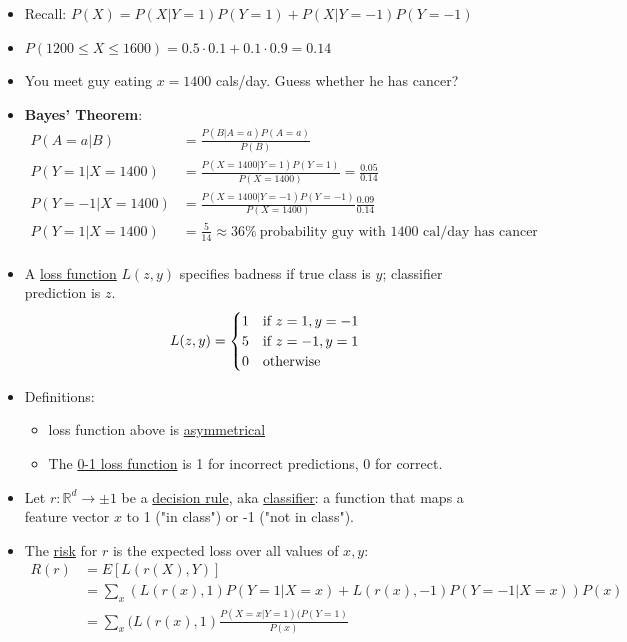 \documentclass[10pt]{article}
\begin{document}
\begin{description}
\begin{itemize}
		\item Recall: $P(X) = P(X|Y=1)P(Y=1) + P(X|Y=-1)P(Y=-1)$
		\item $P(1200 \leq X \leq 1600) = 0.5\cdot 0.1 + 0.1\cdot 0.9 = 0.14$
		\item You meet guy eating $x = 1400$ cals/day. Guess whether he has cancer?
		\item \textbf{Bayes' Theorem}:
			\begin{align*}
				P(A=a|B) &= \frac{P(B|A=a)P(A=a)}{P(B)}\\
				P(Y=1|X=1400) &= \frac{P(X=1400|Y=1)P(Y=1)}{P(X=1400)} = \frac{0.05}{0.14} \\
				P(Y=-1|X=1400) &= \frac{P(X=1400|Y=-1)P(Y=-1)}{P(X=1400)} \frac{0.09}{0.14} \\
				P(Y=1|X=1400) &= \frac{5}{14} \approx 36\% \ \text{probability guy with 1400 cal/day has cancer}\\
			\end{align*}
		\item A \underline{loss function} $L(z, y)$ specifies badness if true class is $y$; classifier prediction is $z$.
			\[
 				L(z, y) = \left\{\def\arraystretch{1.2}%
 					\begin{array}{@{}c@{\quad}l@{}}
    					1 & \text{if $z=1, y=-1$}\\
   						5 & \text{if $z=-1, y=1$}\\
   						0 & \text{otherwise}\\
						\end{array}\right.
			\]
		\item Definitions: 
			\begin{itemize}
				\item loss function above is \underline{asymmetrical}
				\item The \underline{0-1 loss function} is 1 for incorrect predictions, 0 for correct.
			\end{itemize}
		\item Let $r: \mathbb{R}^{d} \rightarrow \pm 1$ be a \underline{decision rule}, aka \underline{classifier}: a function that maps a feature vector $x$ to 1 ("in class") or -1 ("not in class").
		\item The \underline{risk} for $r$ is the expected loss over all values of $x,y$:
			\begin{align*}
				R(r) &= E[L(r(X), Y)]\\
					&= \sum_{x} (L(r(x), 1)P(Y=1|X=x) + L(r(x), -1)P(Y=-1|X=x))P(x)\\
					&= \sum_{x} (L(r(x), 1)\frac{P(X=x|Y=1)(P(Y=1)}{P(x)} 

\end{align*}
\end{itemize}
\end{description}
\end{document}

